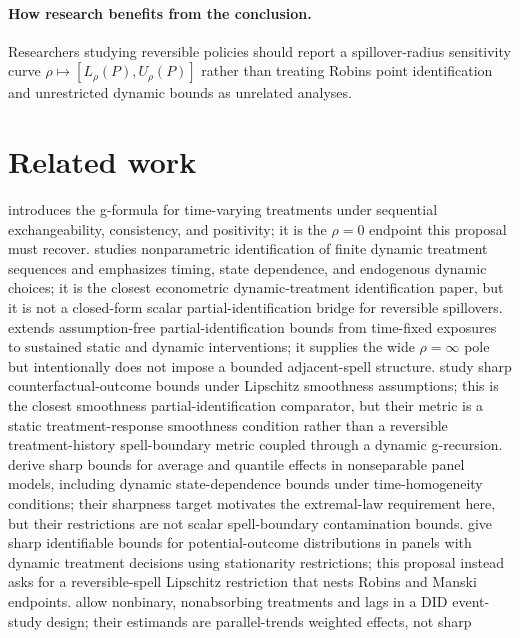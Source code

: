 \documentclass[11pt]{article}
\theoremstyle{definition}
\theoremstyle{plain}
\theoremstyle{remark}
\begin{document}
\paragraph{How research benefits from the conclusion.}
Researchers studying reversible policies should report a spillover-radius
sensitivity curve \( \rho\mapsto [L_\rho(P),U_\rho(P)] \) rather than treating
Robins point identification and unrestricted dynamic bounds as unrelated
analyses.

\section{Related work}
\citet{Robins1986} introduces the g-formula for time-varying treatments under
sequential exchangeability, consistency, and positivity; it is the
\(\rho=0\) endpoint this proposal must recover.  \citet{Han2021} studies
nonparametric identification of finite dynamic treatment sequences and
emphasizes timing, state dependence, and endogenous dynamic choices; it is the
closest econometric dynamic-treatment identification paper, but it is not a
closed-form scalar partial-identification bridge for reversible spillovers.
\citet{DiemerShiSwanson2024} extends assumption-free partial-identification
bounds from time-fixed exposures to sustained static and dynamic interventions;
it supplies the wide \(\rho=\infty\) pole but intentionally does not impose a
bounded adjacent-spell structure.  \citet{KimKwonKwonLee2018} study sharp
counterfactual-outcome bounds under Lipschitz smoothness assumptions; this is
the closest smoothness partial-identification comparator, but their metric is a
static treatment-response smoothness condition rather than a reversible
treatment-history spell-boundary metric coupled through a dynamic g-recursion.
\citet{ChernozhukovFernandezValHahnNewey2013}
derive sharp bounds for average and quantile effects in nonseparable panel
models, including dynamic state-dependence bounds under time-homogeneity
conditions; their sharpness target motivates the extremal-law requirement here,
but their restrictions are not scalar spell-boundary contamination bounds.
\citet{JunLeeShin2016} give sharp identifiable bounds for potential-outcome
distributions in panels with dynamic treatment decisions using stationarity
restrictions; this proposal instead asks for a reversible-spell Lipschitz
restriction that nests Robins and Manski endpoints.  \citet{DeChaisemartinDHaultfoeuille2024}
allow nonbinary, nonabsorbing treatments and lags in a DID event-study design;
their estimands are parallel-trends weighted effects, not sharp
\end{document}
